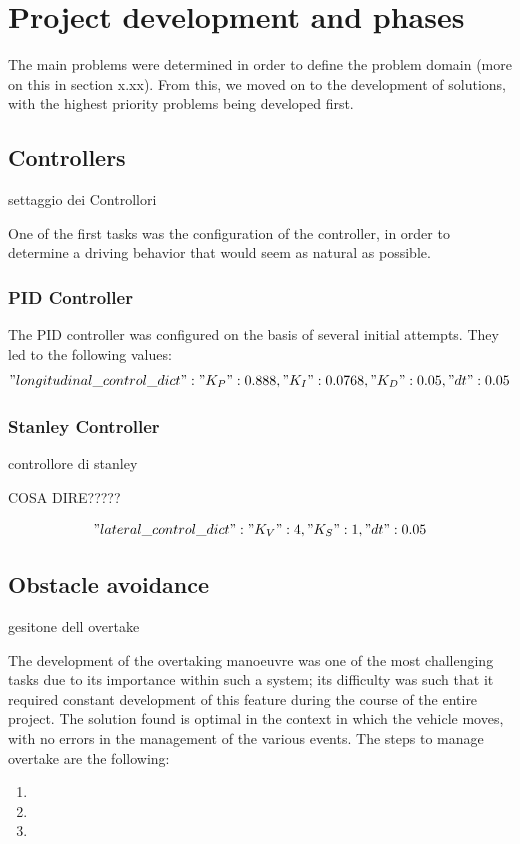\documentclass{article}
\begin{document}
\section{Project development and phases }
The main problems were determined in order to define the problem domain (more on this in section x.xx). 
From this, we moved on to the development of solutions, with the highest priority problems being developed first.
\subsection{Controllers}
settaggio dei Controllori

One of the first tasks was the configuration of the controller, in order to determine a driving behavior 
that would seem as natural as possible. 
\subsubsection{PID Controller}
The PID controller was configured on the basis of several initial attempts. They led to the following values:
$$"longitudinal\_control\_dict" : {"K_P": 0.888 , "K_I": 0.0768, "K_D": 0.05, "dt": 0.05}$$
\subsubsection{Stanley Controller}
controllore di stanley

COSA DIRE?????

$$"lateral\_control\_dict" : {"K_V": 4, "K_S": 1, "dt": 0.05}$$

\subsection{Obstacle avoidance}
gesitone dell overtake

The development of the overtaking manoeuvre was one of the most challenging tasks due to its importance 
within such a system; its difficulty was such that it required constant development of this feature during 
the course of the entire project. The solution found is optimal in the context in which the vehicle moves, 
with no errors in the management of the various events.
The steps to manage overtake are the following:
\begin{enumerate}
    \item 
    \item 
    \item 
\end{enumerate}
\end{document}

